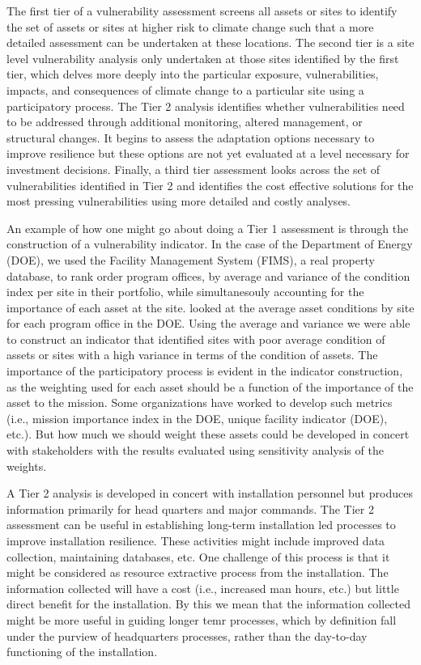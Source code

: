 \documentclass[10pt]{amsart}
\begin{document}
The first tier of a vulnerability assessment screens all assets or sites to identify the set of assets or sites at higher risk to climate change such that a more detailed assessment can be undertaken at these locations.
The second tier is a site level vulnerability analysis only undertaken at those sites identified by the first tier, which delves more deeply into the particular exposure, vulnerabilities, impacts, and consequences of climate change to a particular site using a participatory process.
The Tier 2 analysis identifies whether vulnerabilities need to be addressed through additional monitoring, altered management, or structural changes.
It begins to assess the adaptation options necessary to improve resilience but these options are not yet evaluated at a level necessary for investment decisions.
Finally, a third tier assessment looks across the set of vulnerabilities identified in Tier 2 and identifies the cost effective solutions for the most pressing vulnerabilities using more detailed and costly analyses.

An example of how one might go about doing a Tier 1 assessment is through the construction of a vulnerability indicator.
In the case of the Department of Energy (DOE), we used the Facility Management System (FIMS), a real property database, to rank order program offices, by average and variance of the condition index per site in their portfolio, while simultanesouly accounting for the importance of each asset at the site. looked at the average asset conditions by site for each program office in the DOE. 
Using the average and variance we were able to construct an indicator that identified sites with poor average condition of assets or sites with a high variance in terms of the condition of assets.
The importance of the participatory process is evident in the indicator construction, as the weighting used for each asset should be a function of the importance of the asset to the mission.
Some organizations have worked to develop such metrics (i.e., mission importance index in the DOE, unique facility indicator (DOE), etc.).
But how much we should weight these assets could be developed in concert with stakeholders with the results evaluated using sensitivity analysis of the weights.



A Tier 2 analysis is developed in concert with installation personnel but produces information primarily for head quarters and major commands.
The Tier 2 assessment can be useful in establishing long-term installation led processes to improve installation resilience.
These activities might include improved data collection, maintaining databases, etc.
One challenge of this process is that it might be considered as resource extractive process from the installation.
The information collected will have a cost (i.e., increased man hours, etc.) but little direct benefit for the installation.
By this we mean that the information collected might be more useful in guiding longer temr processes, which by definition fall under the purview of headquarters processes, rather than the day-to-day functioning of the installation. 
\end{document}
